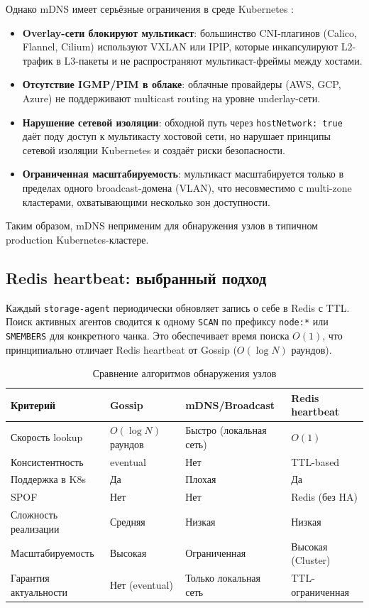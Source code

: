 Однако mDNS имеет серьёзные ограничения в среде Kubernetes \cite{mdns_k8s_limitations}:
\begin{itemize}[leftmargin=*]
  \item \textbf{Overlay-сети блокируют мультикаст}: большинство CNI-плагинов (Calico, Flannel, Cilium) используют VXLAN или IPIP, которые инкапсулируют L2-трафик в L3-пакеты и не распространяют мультикаст-фреймы между хостами.
  \item \textbf{Отсутствие IGMP/PIM в облаке}: облачные провайдеры (AWS, GCP, Azure) не поддерживают multicast routing на уровне underlay-сети.
  \item \textbf{Нарушение сетевой изоляции}: обходной путь через \texttt{hostNetwork: true} даёт поду доступ к мультикасту хостовой сети, но нарушает принципы сетевой изоляции Kubernetes и создаёт риски безопасности.
  \item \textbf{Ограниченная масштабируемость}: мультикаст масштабируется только в пределах одного broadcast-домена (VLAN), что несовместимо с multi-zone кластерами, охватывающими несколько зон доступности.
\end{itemize}

Таким образом, mDNS неприменим для обнаружения узлов в типичном production Kubernetes-кластере.

\subsection*{Redis heartbeat: выбранный подход}

Каждый \texttt{storage-agent} периодически обновляет запись о себе в Redis с TTL. Поиск активных агентов сводится к одному \texttt{SCAN} по префиксу \texttt{node:*} или \texttt{SMEMBERS} для конкретного чанка. Это обеспечивает время поиска $O(1)$, что принципиально отличает Redis heartbeat от Gossip ($O(\log N)$ раундов).

\begin{table}[htbp]
\centering
\caption{Сравнение алгоритмов обнаружения узлов}
\label{tab:discovery}
\begin{tabular}{lp{2.8cm}p{3.2cm}p{3.2cm}}
\toprule
\textbf{Критерий} & \textbf{Gossip} & \textbf{mDNS/Broadcast} & \textbf{Redis heartbeat} \\
\midrule
Скорость lookup      & $O(\log N)$ раундов & Быстро (локальная сеть) & $O(1)$ \\
Консистентность      & eventual              & Нет                     & TTL-based \\
Поддержка в K8s      & Да                   & Плохая                  & Да \\
SPOF                 & Нет                  & Нет                     & Redis (без HA) \\
Сложность реализации & Средняя              & Низкая                  & Низкая \\
Масштабируемость     & Высокая              & Ограниченная            & Высокая (Cluster) \\
Гарантия актуальности & Нет (eventual)     & Только локальная сеть   & TTL-ограниченная \\
\bottomrule
\end{tabular}
\end{table}

